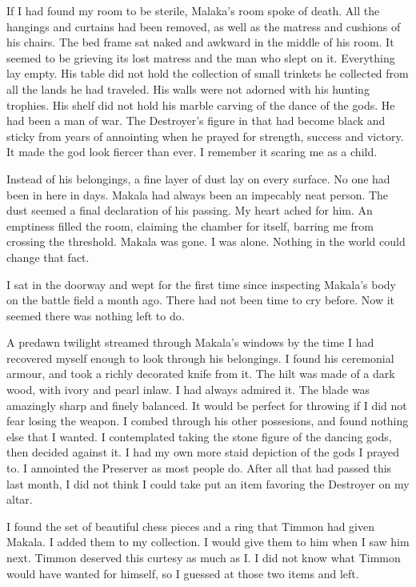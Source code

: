 \documentclass{article}
\begin{document}
If I had found my room to be sterile, Malaka's room spoke of death. All the hangings and curtains had been removed, as well as the matress and cushions of his chairs. The bed frame sat naked and awkward in the middle of his room. It seemed to be grieving its lost matress and the man who slept on it. Everything lay empty. His table did not hold the collection of small trinkets he collected from all the lands he had traveled. His walls were not adorned  with his hunting trophies. His shelf did not hold his marble carving of the dance of the gods. He had been a man of war. The Destroyer's figure in that had become black and sticky from years of annointing when he prayed for strength, success and victory. It made the god look fiercer than ever. I remember it scaring me as a child. 
 
Instead of his belongings, a fine layer of dust lay on every surface. No one had been in here in days. Makala had always been an impecably neat person. The dust seemed a final declaration of his passing. My heart ached for him. An emptiness filled the room, claiming the chamber for itself, barring me from crossing the threshold. Makala was gone. I was alone. Nothing in the world could change that fact. 

I sat in the doorway and wept for the first time since inspecting Makala's body on the battle field a month ago. There had not been time to cry before. Now it seemed there was nothing left to do. 

A predawn twilight streamed through Makala's windows by the time I had recovered myself enough to look through his belongings. I found his ceremonial armour, and took a richly decorated knife from it. The hilt was made of a dark wood, with ivory and pearl inlaw. I had always admired it. The blade was amazingly sharp and finely balanced. It would be perfect for throwing if I did not fear losing the weapon. I combed through his other possesions, and found nothing else that I wanted. I contemplated taking the stone figure of the dancing gods, then decided against it. I had my own more staid depiction of the gods I prayed to. I annointed the Preserver as most people do. After all that had passed this last month, I did not think I could take put an item favoring the Destroyer on my altar. 

I found the set of beautiful chess pieces and a ring that Timmon had given Makala. I added them to my collection. I would give them to him when I saw him next. Timmon deserved this curtesy as much as I. I did not know what Timmon would have wanted for himself, so I guessed at those two items and left. 
\end{document}
